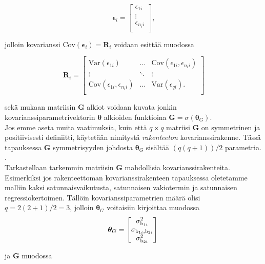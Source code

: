 \documentclass[finnish]{docopts}
\begin{document}
$$
\bm{\epsilon}_i =
\begin{bmatrix}
\epsilon_{1i} \\
\vdots \\
\epsilon_{n_{i}i} \\
\end{bmatrix},
$$

jolloin kovarianssi  $\text{Cov}(\bm{\epsilon}_i) = \bm{R}_i$ voidaan esittää muodossa

$$
\bm{R}_i =
\begin{bmatrix}
\text{Var}(\epsilon_{1i}) & \dots & \text{Cov}(\epsilon_{1i}, \epsilon_{n_{i}i}) \\
\vdots & \ddots & \vdots \\
\text{Cov}(\epsilon_{1i}, \epsilon_{n_{i}i}) & \dots & \text{Var}(\epsilon_{qi}). \\
\end{bmatrix}
$$

\cite{burzykowski13} sekä \cite{west14} mukaan matriisin $\bm{G}$ alkiot voidaan kuvata jonkin kovarianssiparametrivektorin $\bm{\theta}$ alkioiden funktioina $\bm{G} = \sigma(\bm{\theta}_G)$.\\

Jos emme aseta muita vaatimuksia, kuin että $q \times q$ matriisi $\bm{G}$ on symmetrinen ja positiivisesti definiitti, käytetään nimitystä \textit{rakenteeton} kovarianssirakenne. Tässä tapauksessa $\bm{G}$ symmetrisyyden johdosta $\bm{\theta}_G$ sisältää $(q(q + 1))/2$ parametria. \citep{burzykowski13, west14}.\\

Tarkastellaan tarkemmin matriisin $\bm{G}$ mahdollisia kovarianssirakenteita. Esimerkiksi jos rakenteettoman kovarianssirakenteen tapauksessa oletetamme malliin kaksi satunnaisvaikutusta, satunnaisen vakiotermin ja satunnaisen regressiokertoimen. Tällöin kovarianssiparametrien määrä olisi $q=2(2+1)/2=3$, jolloin $\bm{\theta}_G$ voitaisiin kirjoittaa muodossa\\

$$
\bm{\theta}_G =
\begin{bmatrix}
\sigma^2_{\text{b}_{1i}}\\
\sigma_{\text{b}_{1i}, \text{b}_{2i}} \\
\sigma^2_{\text{b}_{2i}} \\
\end{bmatrix}\\
$$

ja $\bm{G}$ muodossa \\
\end{document}
